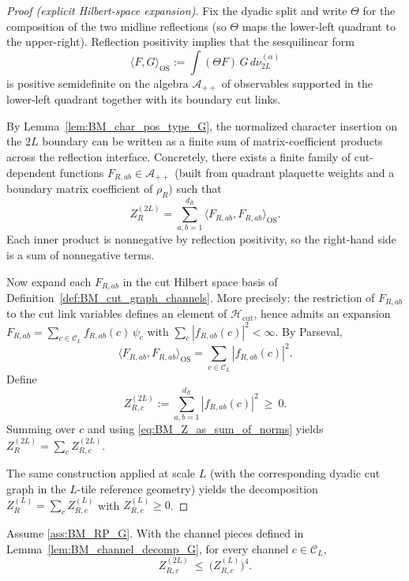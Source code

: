 \begin{proof}[Proof (explicit Hilbert-space expansion)]
Fix the dyadic split and write $\Theta$ for the composition of the two midline reflections (so $\Theta$ maps the lower-left quadrant to the upper-right).
Reflection positivity implies that the sesquilinear form
\[
\langle F,G\rangle_{\mathrm{OS}}:=\int (\Theta F)\,G\,d\nu^{(\alpha)}_{2L}
\]
is positive semidefinite on the algebra $\mathcal A_{++}$ of observables supported in the lower-left quadrant together with its boundary cut links.

By Lemma~\ref{lem:BM_char_pos_type_G}, the normalized character insertion on the $2L$ boundary can be written as a finite sum of
matrix-coefficient products across the reflection interface.
Concretely, there exists a finite family of cut-dependent functions $F_{R,ab}\in\mathcal A_{++}$ (built from quadrant plaquette weights and a boundary
matrix coefficient of $\rho_R$) such that
\begin{equation}\label{eq:BM_Z_as_sum_of_norms}
Z^{(2L)}_{R}=\sum_{a,b=1}^{d_R}\langle F_{R,ab},F_{R,ab}\rangle_{\mathrm{OS}}.
\end{equation}
Each inner product is nonnegative by reflection positivity, so the right-hand side is a sum of nonnegative terms.

Now expand each $F_{R,ab}$ in the cut Hilbert space basis of Definition~\ref{def:BM_cut_graph_channels}.
More precisely: the restriction of $F_{R,ab}$ to the cut link variables defines an element of $\mathcal H_{\mathrm{cut}}$, hence admits an expansion
$F_{R,ab}=\sum_{c\in\mathcal C_L} f_{R,ab}(c)\,\psi_c$ with $\sum_c |f_{R,ab}(c)|^2<\infty$.
By Parseval,
\[
\langle F_{R,ab},F_{R,ab}\rangle_{\mathrm{OS}}
=\sum_{c\in\mathcal C_L} |f_{R,ab}(c)|^2.
\]
Define
\[
Z^{(2L)}_{R,c}:=\sum_{a,b=1}^{d_R}|f_{R,ab}(c)|^2\ \ge\ 0.
\]
Summing over $c$ and using \eqref{eq:BM_Z_as_sum_of_norms} yields $Z^{(2L)}_{R}=\sum_c Z^{(2L)}_{R,c}$.

The same construction applied at scale $L$ (with the corresponding dyadic cut graph in the $L$-tile reference geometry) yields the decomposition
$Z^{(L)}_{R}=\sum_c Z^{(L)}_{R,c}$ with $Z^{(L)}_{R,c}\ge 0$.
\end{proof}

\begin{lemma}\label{lem:BM_channel_chessboard_G}
Assume \ref{ass:BM_RP_G}. With the channel pieces defined in Lemma~\ref{lem:BM_channel_decomp_G}, for every channel $c\in\mathcal C_L$,
\[
Z^{(2L)}_{R,c}\ \le\ \bigl(Z^{(L)}_{R,c}\bigr)^4.
\]
\end{lemma}

